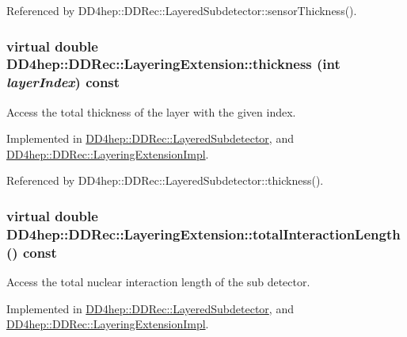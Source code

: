 Referenced by DD4hep::DDRec::LayeredSubdetector::sensorThickness().\hypertarget{class_d_d4hep_1_1_d_d_rec_1_1_layering_extension_a6510f43f195374e6adfb4312c27da450}{
\subsubsection[{thickness}]{\setlength{\rightskip}{0pt plus 5cm}virtual double DD4hep::DDRec::LayeringExtension::thickness (int {\em layerIndex}) const}}
\label{class_d_d4hep_1_1_d_d_rec_1_1_layering_extension_a6510f43f195374e6adfb4312c27da450}


Access the total thickness of the layer with the given index. 

Implemented in \hyperlink{class_d_d4hep_1_1_d_d_rec_1_1_layered_subdetector_ad17611716c4b7318db220afb0f93e123}{DD4hep::DDRec::LayeredSubdetector}, and \hyperlink{class_d_d4hep_1_1_d_d_rec_1_1_layering_extension_impl_a42af8e16d3f3474d29f2ee3af06ce7e7}{DD4hep::DDRec::LayeringExtensionImpl}.

Referenced by DD4hep::DDRec::LayeredSubdetector::thickness().\hypertarget{class_d_d4hep_1_1_d_d_rec_1_1_layering_extension_aa5440bf9dc11305a785765ca155437fa}{
\subsubsection[{totalInteractionLength}]{\setlength{\rightskip}{0pt plus 5cm}virtual double DD4hep::DDRec::LayeringExtension::totalInteractionLength () const}}
\label{class_d_d4hep_1_1_d_d_rec_1_1_layering_extension_aa5440bf9dc11305a785765ca155437fa}


Access the total nuclear interaction length of the sub detector. 

Implemented in \hyperlink{class_d_d4hep_1_1_d_d_rec_1_1_layered_subdetector_a632134e4968e37fad507321af6c87cb9}{DD4hep::DDRec::LayeredSubdetector}, and \hyperlink{class_d_d4hep_1_1_d_d_rec_1_1_layering_extension_impl_a1f474d15b2423bea9768d3a03625d507}{DD4hep::DDRec::LayeringExtensionImpl}.

